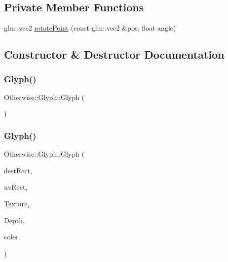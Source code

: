 \subsection*{Private Member Functions}
\begin{DoxyCompactItemize}
\item 
glm\+::vec2 \hyperlink{class_otherwise_1_1_glyph_a1bfdcf1a8e9cbb1f2b86fb9f3d09160c}{rotate\+Point} (const glm\+::vec2 \&pos, float angle)
\end{DoxyCompactItemize}


\subsection{Constructor \& Destructor Documentation}
\mbox{\label{class_otherwise_1_1_glyph_a804dc361bec171ee7e8843a6b1e3c008}} 
\subsubsection{\texorpdfstring{Glyph()}{Glyph()}\hspace{0.1cm}{\footnotesize\ttfamily [1/3]}}
{\footnotesize\ttfamily Otherwise\+::\+Glyph\+::\+Glyph (\begin{DoxyParamCaption}{ }\end{DoxyParamCaption})\hspace{0.3cm}{\ttfamily [inline]}}

\mbox{\label{class_otherwise_1_1_glyph_a1ffec3de1654e7bc69ee7badfec8fdbd}} 
\subsubsection{\texorpdfstring{Glyph()}{Glyph()}\hspace{0.1cm}{\footnotesize\ttfamily [2/3]}}
{\footnotesize\ttfamily Otherwise\+::\+Glyph\+::\+Glyph (\begin{DoxyParamCaption}\item[{const glm\+::vec4 \&}]{dest\+Rect,  }\item[{const glm\+::vec4 \&}]{uv\+Rect,  }\item[{G\+Luint}]{Texture,  }\item[{float}]{Depth,  }\item[{const \hyperlink{struct_otherwise_1_1_color_r_g_b_a8}{Color\+R\+G\+B\+A8} \&}]{color }\end{DoxyParamCaption})}

